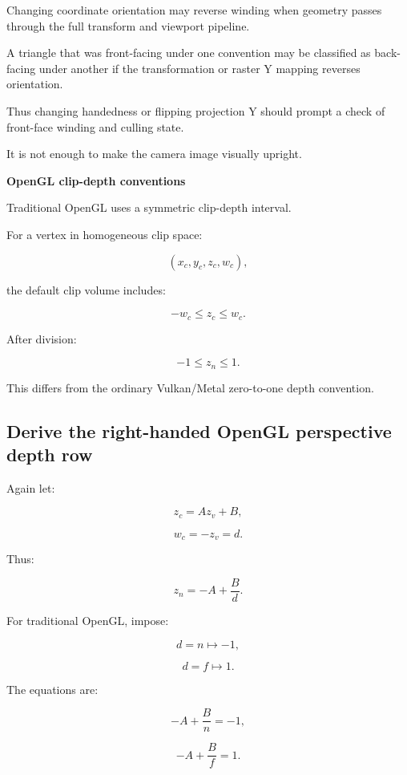 \hypertarget{02-foundations-ii-ch033-handedness-and-face-orientation}{}

Changing coordinate orientation may reverse winding when geometry passes through the full transform and viewport pipeline.

A triangle that was front-facing under one convention may be classified as back-facing under another if the transformation or raster Y mapping reverses orientation.

Thus changing handedness or flipping projection Y should prompt a check of front-face winding and culling state.

It is not enough to make the camera image visually upright.

\textbf{OpenGL clip-depth conventions}

Traditional OpenGL uses a symmetric clip-depth interval.

For a vertex in homogeneous clip space:

\[
 (x_c,y_c,z_c,w_c),
\]

the default clip volume includes:

\[
 \boxed{-w_c\le z_c\le w_c}.
\]

After division:

\[
 \boxed{-1\le z_n\le1}.
\]

This differs from the ordinary Vulkan/Metal zero-to-one depth convention.

\subsection{Derive the right-handed OpenGL perspective depth row}\label{02-foundations-ii-ch033-derive-the-right-handed-opengl-perspective-depth-row}

\hypertarget{02-foundations-ii-ch033-derive-the-right-handed-opengl-perspective-depth-row}{}

Again let:

\[
 z_c=Az_v+B,
\]

\[
 w_c=-z_v=d.
\]

Thus:

\[
 z_n=-A+\frac Bd.
\]

For traditional OpenGL, impose:

\[
 d=n\mapsto-1,
\]

\[
 d=f\mapsto1.
\]

The equations are:

\[
 -A+\frac Bn=-1,
\]

\[
 -A+\frac Bf=1.
\]

